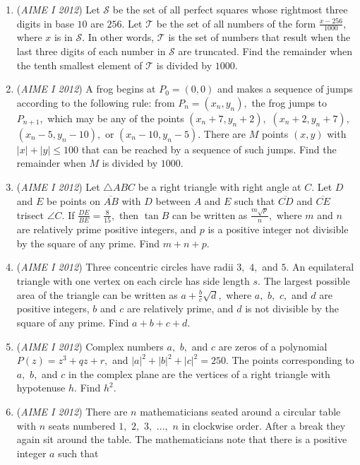 \begin{enumerate}
	\item (\textit{AIME I 2012}) Let $\mathcal{S}$ be the set of all perfect squares whose rightmost three digits in base $10$ are $256$. Let $\mathcal{T}$ be the set of all numbers of the form $\frac{x-256}{1000}$, where $x$ is in $\mathcal{S}$. In other words, $\mathcal{T}$ is the set of numbers that result when the last three digits of each number in $\mathcal{S}$ are truncated. Find the remainder when the tenth smallest element of $\mathcal{T}$ is divided by $1000$.


 

	\item (\textit{AIME I 2012}) A frog begins at $P_0 = (0,0)$ and makes a sequence of jumps according to the following rule: from $P_n = (x_n, y_n),$ the frog jumps to $P_{n+1},$ which may be any of the points $(x_n + 7, y_n + 2),$ $(x_n + 2, y_n + 7),$ $(x_n - 5, y_n - 10),$ or $(x_n - 10, y_n - 5).$ There are $M$ points $(x, y)$ with $|x| + |y| \le 100$ that can be reached by a sequence of such jumps. Find the remainder when $M$ is divided by $1000.$


	\item (\textit{AIME I 2012}) Let $\triangle ABC$ be a right triangle with right angle at $C.$ Let $D$ and $E$ be points on $\overline{AB}$ with $D$ between $A$ and $E$ such that $\overline{CD}$ and $\overline{CE}$ trisect $\angle C.$ If $\frac{DE}{BE} = \frac{8}{15},$ then $\tan B$ can be written as $\frac{m \sqrt{p}}{n},$ where $m$ and $n$ are relatively prime positive integers, and $p$ is a positive integer not divisible by the square of any prime. Find $m+n+p.$


	\item (\textit{AIME I 2012}) Three concentric circles have radii $3,$ $4,$ and $5.$ An equilateral triangle with one vertex on each circle has side length $s.$ The largest possible area of the triangle can be written as $a + \frac{b}{c} \sqrt{d},$ where $a,$ $b,$ $c,$ and $d$ are positive integers, $b$ and $c$ are relatively prime, and $d$ is not divisible by the square of any prime. Find $a+b+c+d.$


	\item (\textit{AIME I 2012}) Complex numbers $a,$ $b,$ and $c$ are zeros of a polynomial $P(z) = z^3 + qz + r,$ and $|a|^2 + |b|^2 + |c|^2 = 250.$ The points corresponding to $a,$ $b,$ and $c$ in the complex plane are the vertices of a right triangle with hypotenuse $h.$ Find $h^2.$


	\item (\textit{AIME I 2012}) There are $n$ mathematicians seated around a circular table with $n$ seats numbered $1,$ $2,$ $3,$ $...,$ $n$ in clockwise order. After a break they again sit around the table. The mathematicians note that there is a positive integer $a$ such that



\end{enumerate}
